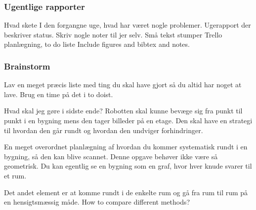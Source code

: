 \subsubsection{Ugentlige rapporter}
Hvad skete I den forgangne uge, hvad har været nogle problemer.
Ugerapport der beskriver status.
Skriv nogle noter til jer selv.
Små tekst stumper
Trello planlægning, to do liste
Include figures and bibtex and notes.


\subsubsection{Brainstorm}
Lav en meget præcis liste med ting du skal have gjort så du altid har noget at lave.
Brug en time på det i to doist.

Hvad skal jeg gøre i sidste ende?
Robotten skal kunne bevæge sig fra punkt til punkt i en bygning mens den tager billeder på en etage. Den skal have en strategi til hvordan den går rundt og hvordan den undviger forhindringer.

En meget overordnet planlægning af hvordan du kommer systematisk rundt i en bygning, så den kan blive scannet.
Denne opgave behøver ikke være så geometrisk. Du kan egentlig se en bygning som en graf, hvor hver knude svarer til et rum.

Det andet element er at komme rundt i de enkelte rum og gå fra rum til rum på en hensigtsmæssig måde.
How to compare different methods?